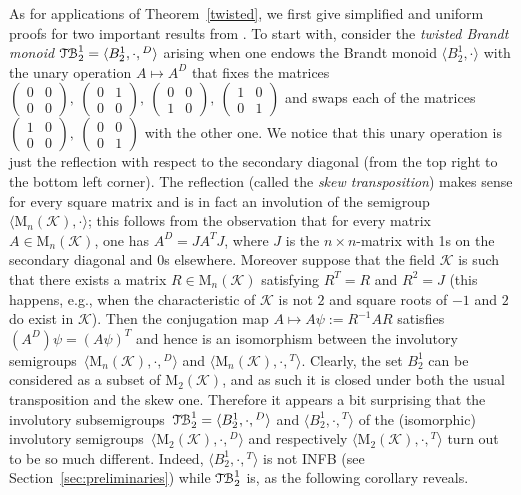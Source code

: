 \documentclass[11pt,reqno]{amsart}
\newcommand{\sgp}{semi\-group}
\newcommand{\sgps}{semi\-groups}
\newcommand{\iss}{involutory semi\-groups}
\newcommand{\TB}{\ensuremath{\mathcal{T\kern-.5pt B}_2^1}}
\begin{document}
As for applications of Theorem~\ref{twisted}, we first give simplified and uniform proofs for two important results from \cite{ADV:2012}.
To start with, consider the \emph{twisted Brandt monoid} $\TB=\langle B_2^1,\cdot,{}^D\rangle$ arising when one endows the Brandt monoid
$\langle B_2^1,\cdot\rangle$ with the unary operation $A\mapsto A^D$ that fixes the matrices $\left(\begin{smallmatrix} 0 & 0\\ 0 &
0\end{smallmatrix}\right),\ \left(\begin{smallmatrix} 0 & 1\\ 0 & 0\end{smallmatrix}\right),\ \left(\begin{smallmatrix} 0 & 0\\ 1 &
0\end{smallmatrix}\right),\ \left(\begin{smallmatrix} 1 & 0\\ 0 & 1\end{smallmatrix}\right)$ and swaps each of the matrices
$\left(\begin{smallmatrix}1 & 0\\ 0 & 0\end{smallmatrix}\right),\ \left(\begin{smallmatrix} 0 & 0\\ 0 & 1\end{smallmatrix}\right)$ with the
other one. We notice that this unary operation is just the reflection with respect to the secondary diagonal (from the top right to the
bottom left corner). The reflection (called the \emph{skew transposition}) makes sense for every square matrix and is in fact an involution
of the \sgp\ $\langle\mathrm{M}_n(\mathcal{K}),\cdot\rangle$; this follows from the observation that for every matrix
$A\in\mathrm{M}_n(\mathcal{K})$, one has $A^D=JA^TJ$, where $J$ is the $n\times n$-matrix with 1s on the secondary diagonal and 0s
elsewhere. Moreover suppose that the field $\mathcal{K}$ is such that there exists a matrix $R\in\mathrm{M}_n(\mathcal{K})$ satisfying
$R^T=R$ and $R^2=J$ (this happens, e.g., when the characteristic of $\mathcal{K}$ is not  $2$ and  square roots of ${-1}$ and ${2}$ do
exist in $\mathcal{K}$). Then the conjugation map $A\mapsto A\psi:= R^{-1}AR$ satisfies $(A^D)\psi=(A\psi)^T$ and hence is an isomorphism
between the \iss\ $\langle\mathrm{M}_n(\mathcal{K}),\cdot,{}^D\rangle$ and $\langle\mathrm{M}_n(\mathcal{K}),\cdot,{}^T\rangle$. Clearly,
the set $B_2^1$ can be considered as a subset of $\mathrm{M}_2(\mathcal{K})$, and as such it is closed under both the usual transposition
and the skew one. Therefore it appears a bit surprising that the involutory sub\sgps\ $\TB=\langle B_2^1,\cdot,{}^D\rangle$ and $\langle
B_2^1,\cdot,{}^T\rangle$ of the (isomorphic) \iss\ $\langle\mathrm{M}_2(\mathcal{K}),\cdot,{}^D\rangle$ and respectively
$\langle\mathrm{M}_2(\mathcal{K}),\cdot,{}^T\rangle$ turn out to be so much different. Indeed, $\langle B_2^1,\cdot,{}^T\rangle$ is not
INFB (see Section~\ref{sec:preliminaries}) while $\TB$ is, as the following corollary reveals.
\end{document}

